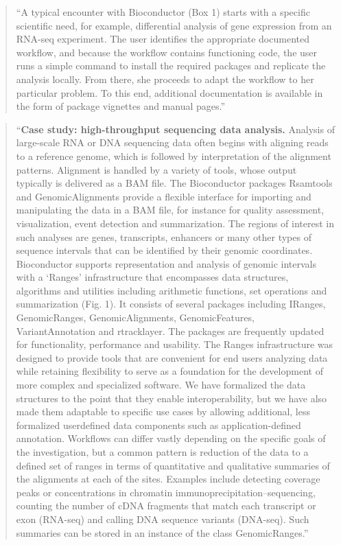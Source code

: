 \documentclass[]{tufte-book}
\begin{document}
\begin{quote}
``A typical encounter with Bioconductor (Box 1) starts with a specific scientific need, for example, differential analysis of gene expression
from an RNA-seq experiment. The user identifies the appropriate
documented workflow, and because the workflow contains functioning code, the user runs a simple command to install the required
packages and replicate the analysis locally. From there, she proceeds
to adapt the workflow to her particular problem. To this end, additional documentation is available in the form of package vignettes
and manual pages.'' \citep{huber2015orchestrating}
\end{quote}

\begin{quote}
``\textbf{Case study: high-throughput sequencing data analysis.} Analysis of
large-scale RNA or DNA sequencing data often begins with aligning reads to a
reference genome, which is followed by interpretation of the alignment patterns.
Alignment is handled by a variety of tools, whose output typically is delivered
as a BAM file. The Bioconductor packages Rsamtools and GenomicAlignments provide
a flexible interface for importing and manipulating the data in a BAM file, for
instance for quality assessment, visualization, event detection and
summarization. The regions of interest in such analyses are genes, transcripts,
enhancers or many other types of sequence intervals that can be identified by
their genomic coordinates. Bioconductor supports representation and analysis of
genomic intervals with a `Ranges' infrastructure that encompasses data
structures, algorithms and utilities including arithmetic functions, set
operations and summarization (Fig. 1). It consists of several packages
including IRanges, GenomicRanges, GenomicAlignments, GenomicFeatures,
VariantAnnotation and rtracklayer. The packages are frequently updated for
functionality, performance and usability. The Ranges infrastructure was designed
to provide tools that are convenient for end users analyzing data while
retaining flexibility to serve as a foundation for the development of more
complex and specialized software. We have formalized the data structures to the
point that they enable interoperability, but we have also made them adaptable to
specific use cases by allowing additional, less formalized userdefined data
components such as application-defined annotation. Workflows can differ vastly
depending on the specific goals of the investigation, but a common pattern is
reduction of the data to a defined set of ranges in terms of quantitative and
qualitative summaries of the alignments at each of the sites. Examples include
detecting coverage peaks or concentrations in chromatin
immunoprecipitation--sequencing, counting the number of cDNA fragments that match
each transcript or exon (RNA-seq) and calling DNA sequence variants (DNA-seq).
Such summaries can be stored in an instance of the class GenomicRanges.''
\citep{huber2015orchestrating}
\end{quote}
\end{document}
